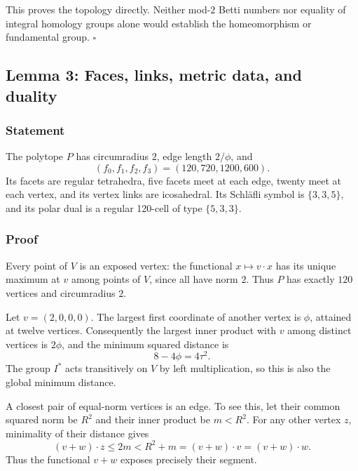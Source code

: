 \documentclass[
  10pt,
  a4paper,
]{article}
\begin{document}
This proves the topology directly. Neither mod-\(2\) Betti numbers nor
equality of integral homology groups alone would establish the
homeomorphism or fundamental group. \(\square\)

\subsection{Lemma 3: Faces, links, metric data, and
duality}\label{lemma-3-faces-links-metric-data-and-duality}

\subsubsection{Statement}\label{statement-2}

The polytope \(P\) has circumradius \(2\), edge length \(2/\phi\), and
\begin{equation}
(f_0,f_1,f_2,f_3)=(120,720,1200,600).
\end{equation} Its facets are regular tetrahedra, five facets meet at
each edge, twenty meet at each vertex, and its vertex links are
icosahedral. Its Schläfli symbol is \(\{3,3,5\}\), and its polar dual is
a regular 120-cell of type \(\{5,3,3\}\).

\subsubsection{Proof}\label{proof-2}

Every point of \(V\) is an exposed vertex: the functional
\(x\mapsto v\cdot x\) has its unique maximum at \(v\) among points of
\(V\), since all have norm \(2\). Thus \(P\) has exactly \(120\)
vertices and circumradius \(2\).

Let \(v=(2,0,0,0)\). The largest first coordinate of another vertex is
\(\phi\), attained at twelve vertices. Consequently the largest inner
product with \(v\) among distinct vertices is \(2\phi\), and the minimum
squared distance is \begin{equation}
8-4\phi=4\tau^2.
\end{equation} The group \(I^*\) acts transitively on \(V\) by left
multiplication, so this is also the global minimum distance.

A closest pair of equal-norm vertices is an edge. To see this, let their
common squared norm be \(R^2\) and their inner product be \(m<R^2\). For
any other vertex \(z\), minimality of their distance gives
\begin{equation}
(v+w)\cdot z\le2m<R^2+m=(v+w)\cdot v=(v+w)\cdot w.
\end{equation} Thus the functional \(v+w\) exposes precisely their
segment.
\end{document}
